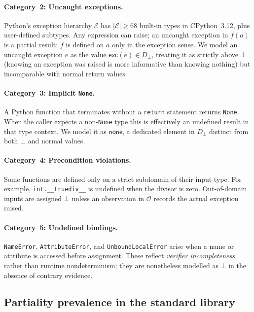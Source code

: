 \documentclass[11pt]{article}
\newcommand{\LiftD}[1]{#1_{\bot}}           %
\newcommand{\PNone}{\mathsf{none}}          %
\newcommand{\PExc}[1]{\mathsf{exc}(#1)}    %
\newcommand{\ObsSet}{\mathcal{O}}          %
\newcommand{\ExcH}{\mathcal{E}}            %
\begin{document}
\paragraph{Category~2: Uncaught exceptions.}
Python's exception hierarchy $\ExcH$ has $|\ExcH| \ge 68$ built-in
types in CPython~3.12, plus user-defined subtypes.  Any expression can
raise; an uncaught exception in $f(a)$ is a partial result: $f$ is
defined on $a$ only in the exception sense.  We model an uncaught
exception $e$ as the value $\PExc{e} \in \LiftD{D}$, treating it as
strictly above $\bot$ (knowing an exception was raised is more
informative than knowing nothing) but incomparable with normal return
values.

\paragraph{Category~3: Implicit \texttt{None}.}
A Python function that terminates without a \texttt{return} statement
returns \texttt{None}.  When the caller expects a non-\texttt{None}
type this is effectively an undefined result in that type context.  We
model it as $\PNone$, a dedicated element in $\LiftD{D}$ distinct from
both $\bot$ and normal values.

\paragraph{Category~4: Precondition violations.}
Some functions are defined only on a strict subdomain of their input
type.  For example, \lstinline{int.__truediv__} is undefined when the
divisor is zero.  Out-of-domain inputs are assigned $\bot$ unless an
observation in $\ObsSet$ records the actual exception raised.

\paragraph{Category~5: Undefined bindings.}
\texttt{NameError}, \texttt{AttributeError}, and
\texttt{UnboundLocalError} arise when a name or attribute is accessed
before assignment.  These reflect \emph{verifier incompleteness} rather
than runtime nondeterminism; they are nonetheless modelled as $\bot$ in
the absence of contrary evidence.

\subsection{Partiality prevalence in the standard library}
\end{document}
